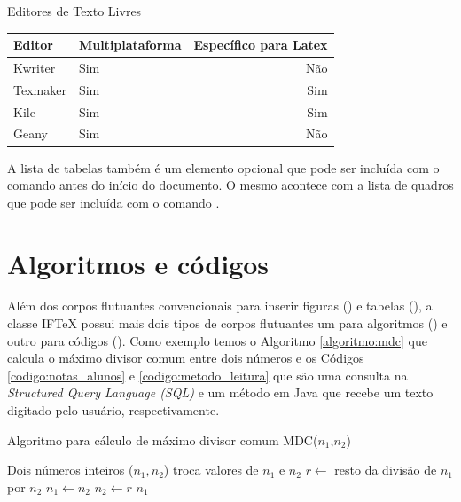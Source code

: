\begin{quadro}[!htb] \centering
\caption{Editores de Texto Livres} \label{quadro:editores_texto_livres}
\begin{varwidth}{\linewidth}
\begin{tabular}{|l|l|r|}        \hline
Editor     & Multiplataforma & Específico para Latex \\ \hline
Kwriter    & Sim             & Não                   \\
Texmaker   & Sim             & Sim                   \\
Kile       & Sim             & Sim                   \\
Geany      & Sim             & Não                   \\ \hline
\end{tabular}
\end{varwidth}
\end{quadro}

A lista de tabelas também é um elemento opcional que pode ser incluída com o comando  antes do início do documento. O mesmo acontece com a lista de quadros que pode ser incluída com o comando .

\section{Algoritmos e códigos} \label{secao:algoritmos_e_codigos}

Além dos corpos flutuantes convencionais para inserir figuras () e tabelas (), a classe {IF\TeX} possui mais dois tipos de corpos flutuantes um para algoritmos () e outro para códigos (). Como exemplo temos o Algoritmo \ref{algoritmo:mdc} que calcula o máximo divisor comum entre dois números e os Códigos \ref{codigo:notas_alunos} e \ref{codigo:metodo_leitura} que são uma consulta na \textit{Structured Query Language (SQL)} e um método em Java que recebe um texto digitado pelo usuário, respectivamente.

\begin{algoritmo}[!htb]
\caption{Algoritmo para cálculo de máximo divisor comum MDC($n_1$,$n_2$)} \label{algoritmo:mdc}
\begin{algorithmic}[1]
 \Require Dois números inteiros ($n_1, n_2$)
  
   \State troca valores de $n_1$ e $n_2$
 \EndIf
 \Repeat
   \State $r \leftarrow$ resto da divisão de $n_1$ por $n_2$
   \State $n_1 \leftarrow n_2$
   \State $n_2 \leftarrow r$
 \Return $n_1$
\end{algorithmic}
\end{algoritmo}

